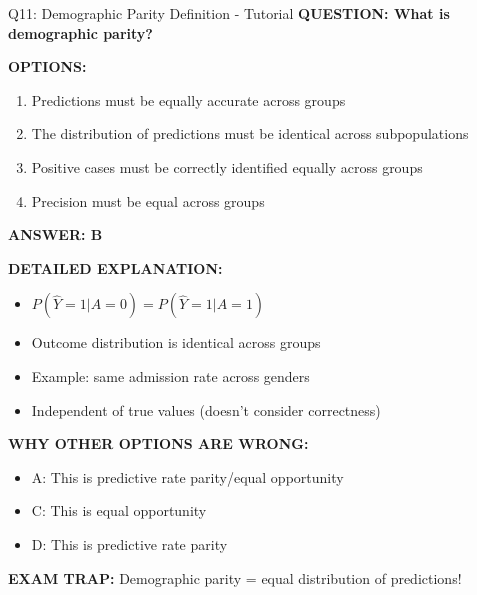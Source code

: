 \documentclass[8pt]{beamer}
\begin{document}
	\begin{frame}{Q11: Demographic Parity Definition - Tutorial}
		\fontsize{6.5}{7.5}\selectfont
		\textbf{QUESTION: What is demographic parity?}
		
		\vspace{0.1cm}
		\textbf{OPTIONS:}
		\begin{enumerate}
			\item Predictions must be equally accurate across groups
			\item The distribution of predictions must be identical across subpopulations
			\item Positive cases must be correctly identified equally across groups
			\item Precision must be equal across groups
		\end{enumerate}
		
		\vspace{0.1cm}
		\textcolor{myblue}{\textbf{ANSWER: B}}
		
		\vspace{0.1cm}
		\textbf{DETAILED EXPLANATION:}
		\begin{itemize}
			\item $P(\hat{Y}=1|A=0) = P(\hat{Y}=1|A=1)$
			\item Outcome distribution is identical across groups
			\item Example: same admission rate across genders
			\item Independent of true values (doesn't consider correctness)
		\end{itemize}
		
		\vspace{0.1cm}
		\textcolor{myred}{\textbf{WHY OTHER OPTIONS ARE WRONG:}}
		\begin{itemize}
			\item \textcolor{myred}{A:} This is predictive rate parity/equal opportunity
			\item \textcolor{myred}{C:} This is equal opportunity
			\item \textcolor{myred}{D:} This is predictive rate parity
		\end{itemize}
		
		\textcolor{myred}{\textbf{EXAM TRAP:}} Demographic parity = \textcolor{myblue}{equal distribution of predictions}!
	\end{frame}
	
\end{document}
